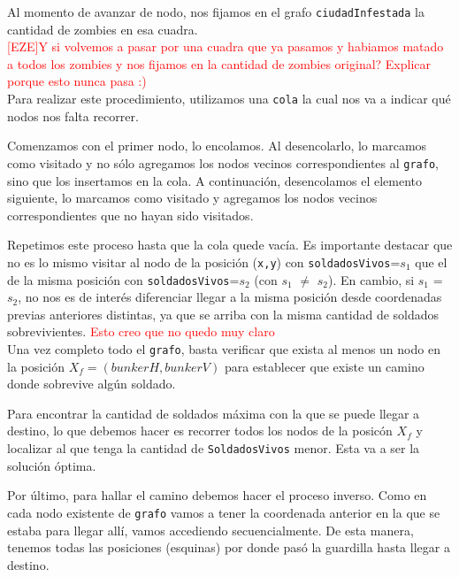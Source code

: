 Al momento de avanzar de nodo, nos fijamos en el grafo \texttt{ciudadInfestada} la cantidad de zombies en esa cuadra.\\


\textcolor{red}{[EZE]Y si volvemos a pasar por una cuadra que ya pasamos y habiamos matado a todos los zombies y nos fijamos en la cantidad de zombies original? Explicar porque esto nunca pasa :)}\\

Para realizar este procedimiento, utilizamos una \texttt{cola} la cual nos va a indicar qu\'e nodos nos falta recorrer.

Comenzamos con el primer nodo, lo encolamos. Al desencolarlo, lo marcamos como visitado y no s\'olo agregamos los nodos vecinos correspondientes al \texttt{grafo}, sino que los insertamos en la cola. A continuaci\'on, desencolamos el elemento siguiente, lo marcamos como visitado y agregamos los nodos vecinos correspondientes que no hayan sido visitados.

Repetimos este proceso hasta que la cola quede vac\'ia. Es importante destacar que no es lo mismo visitar al nodo de la posici\'on (\texttt{x,y}) con \texttt{soldadosVivos}=$s_1$ que el de la misma posici\'on con \texttt{soldadosVivos}=$s_2$ (con $s_1$ $\neq$ $s_2$).
En cambio, si $s_1$ = $s_2$, no nos es de inter\'es diferenciar llegar a la misma posici\'on desde coordenadas previas anteriores distintas, ya que se arriba con la misma cantidad de soldados sobrevivientes. \textcolor{red}{Esto creo que no quedo muy claro}\\

Una vez completo todo el \texttt{grafo}, basta verificar que exista al menos un nodo en la posici\'on $X_f = (bunkerH, bunkerV)$ para establecer que existe un camino donde sobrevive alg\'un soldado.

Para encontrar la cantidad de soldados m\'axima con la que se puede llegar a destino, lo que debemos hacer es recorrer todos los nodos de la posic\'on $X_f$ y localizar al que tenga la cantidad de \texttt{SoldadosVivos} menor. Esta va a ser la soluci\'on \'optima.

Por \'ultimo, para hallar el camino debemos hacer el proceso inverso. Como en cada nodo existente de \texttt{grafo} vamos a tener la coordenada anterior en la que se estaba para llegar all\'i, vamos accediendo secuencialmente. De esta manera, tenemos todas las posiciones (esquinas) por donde pas\'o la guardilla hasta llegar a destino.\\

